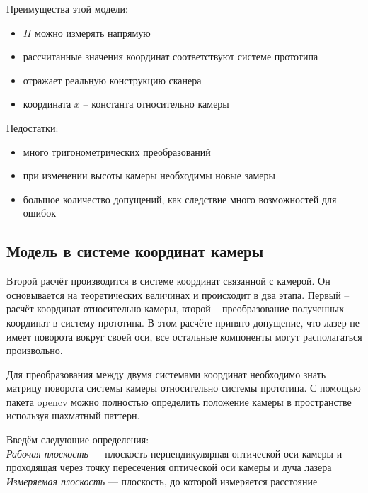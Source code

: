             Преимущества этой модели:
            \begin{itemize}
                \item $ H $ можно измерять напрямую
                \item рассчитанные значения координат соответствуют системе прототипа
                \item отражает реальную конструкцию сканера
                \item координата $ x $ -- константа относительно камеры
            \end{itemize}
            
            Недостатки:
            \begin{itemize}
                \item много тригонометрических преобразований
                \item при изменении высоты камеры необходимы новые замеры
                \item большое количество допущений, как следствие много возможностей для ошибок
            \end{itemize}

        \subsection{Модель в системе координат камеры}
            Второй расчёт производится в системе координат связанной с камерой. Он основывается на теоретических величинах и происходит в два этапа. Первый -- расчёт координат относительно камеры, второй -- преобразование полученных координат в систему прототипа. В этом расчёте принято допущение, что лазер не имеет поворота вокруг своей оси, все остальные компоненты могут располагаться произвольно.
            
            Для преобразования между двумя системами координат необходимо знать матрицу поворота системы камеры относительно системы прототипа. С помощью пакета opencv можно полностью определить положение камеры в пространстве используя шахматный паттерн.

            Введём следующие определения:\\
            \textit{Рабочая плоскость} --- плоскость перпендикулярная оптической оси камеры и проходящая через точку пересечения оптической оси камеры и луча лазера\\
            \textit{Измеряемая плоскость} --- плоскость, до которой измеряется расстояние 

